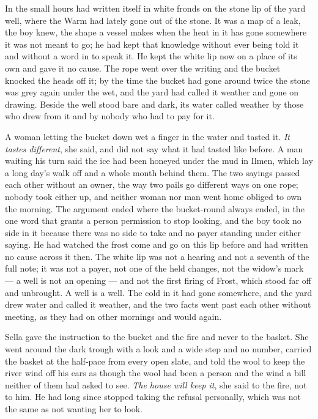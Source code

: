 In the small hours  had written itself in white fronds on the stone lip of the yard well, where the Warm had lately gone out of the stone. It was a map of a leak, the boy knew, the shape a vessel makes when the heat in it has gone somewhere it was not meant to go; he had kept that knowledge without ever being told it and without a word in  to speak it. He kept the white lip now on a place of its own and gave it no cause. The rope went over the writing and the bucket knocked the heads off it; by the time the bucket had gone around twice the stone was grey again under the wet, and the yard had called it weather and gone on drawing. Beside the well  stood bare and dark, its water called weather by those who drew from it and by nobody who had to pay for it.

A woman letting the bucket down wet a finger in the water and tasted it. \emph{It tastes different}, she said, and did not say what it had tasted like before. A man waiting his turn said the ice had been honeyed under the mud in Ilmen, which lay a long day's walk off and a whole month behind them. The two sayings passed each other without an owner, the way two pails go different ways on one rope; nobody took either up, and neither woman nor man went home obliged to own the morning. The argument ended where the bucket-round always ended, in the one word that grants a person permission to stop looking, and the boy took no side in it because there was no side to take and no payer standing under either saying. He had watched the frost come and go on this lip before and had written no cause across it then. The white lip was not a hearing and not a seventh of the full note; it was not a payer, not one of the held changes, not the widow's mark --- a well is not an opening --- and not the first firing of Frost, which stood far off and unbrought. A well is a well. The cold in it had gone somewhere, and the yard drew water and called it weather, and the two facts went past each other without meeting, as they had on other mornings and would again.

Sella gave the instruction to the bucket and the fire and never to the basket. She went around the dark trough with a look and a wide step and no number, carried the basket at the half-pace from every open slate, and told the wool to keep the river wind off his ears as though the wool had been a person and the wind a bill neither of them had asked to see. \emph{The house will keep it}, she said to the fire, not to him. He had long since stopped taking the refusal personally, which was not the same as not wanting her to look.

